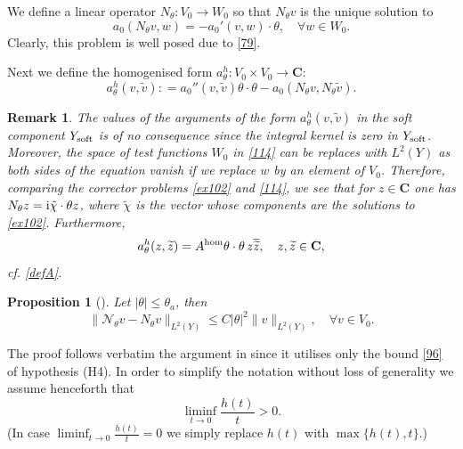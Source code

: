 \documentclass[11pt]{article}
\newcommand\soft{{\rm soft}}
\def\rmi{{\rm i}}
\def\C{\mathbf {C}}
\def\hom{{\rm hom}}
\newtheorem{proposition}[theorem]{Proposition}
\newtheorem{remark}[theorem]{Remark}
\theoremstyle{remark}
\begin{document}
We define a linear operator $N_\theta : V_0 \to W_0$ so that $N_\theta v$ is the unique solution to
\begin{equation}\label{114}
	a_0(N_\theta v, w) = - a_0'(v,w)\cdot \theta, \quad \forall w\in W_0.
\end{equation}
Clearly, this problem is well posed due to \eqref{79}.

Next we define the homogenised form $a_\theta^h: V_0\times V_0 \to \C$:
\begin{equation*}
	a_\theta^h(v,\tilde v): = a_0''(v,\tilde v)\theta \cdot\theta - a_0(N_\theta v, N_\theta \tilde v).
\end{equation*}

\begin{remark}\label{r7.3}
	The values of the arguments of the  form $a_\theta^h(v,\tilde v)$  in the soft component $Y_\soft$ is of no consequence  since the integral kernel is zero in  $Y_\soft$. Moreover, the space of test functions $W_0$ in \eqref{114} can be replaces with ${L^2(Y)}$ as both sides of the equation vanish if we replace $w$ by an element of $V_0$. Therefore, comparing the corrector problems \eqref{ex102} and \eqref{114}, we see that for $z\in \C$  one has $N_\theta z = \rmi \tilde \chi \cdot \theta z$, where $\tilde \chi$ is the vector whose components are the solutions to \eqref{ex102}. Furthermore,
	\begin{equation}\label{200}
		a_\theta^h(z,\widetilde z) = A^\hom \theta \cdot \theta \, z \overline{\widetilde z}, \quad z, \widetilde z \in \C,
	\end{equation}
	cf. \eqref{defA}.
\end{remark}

\begin{proposition}[{\cite[Proposition 5.4]{CKS2023}}]
Let $|\theta|\leq \theta_a$, then
	\begin{equation}\label{120a}
		\|\mathcal N_\theta v -  N_\theta v\|_{L^2(Y)} \leq C|\theta|^2 \| v\|_{L^2(Y)},\quad \forall v\in V_0.
	\end{equation}
\end{proposition}
\noindent The proof follows verbatim the argument in \cite{CKS2023} since it utilises  only the bound \eqref{96} of hypothesis (H4).
In order to simplify the notation without loss of generality we assume henceforth that
\begin{equation*}
	\liminf_{t \to 0} \frac{h(t)}{t} > 0.
\end{equation*}
(In case $\liminf_{t \to 0} \frac{h(t)}{t} = 0$ we simply replace $h(t)$ with $\max\{h(t) , t\}$.)
\end{document}
